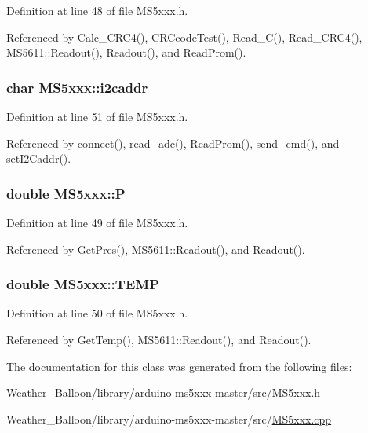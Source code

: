 Definition at line 48 of file M\+S5xxx.\+h.



Referenced by Calc\+\_\+\+C\+R\+C4(), C\+R\+Ccode\+Test(), Read\+\_\+\+C(), Read\+\_\+\+C\+R\+C4(), M\+S5611\+::\+Readout(), Readout(), and Read\+Prom().

\subsubsection[{\texorpdfstring{i2caddr}{i2caddr}}]{\setlength{\rightskip}{0pt plus 5cm}char M\+S5xxx\+::i2caddr\hspace{0.3cm}{\ttfamily [protected]}}\hypertarget{class_m_s5xxx_a66741674bcf2bda11f5645b63797a279}{}\label{class_m_s5xxx_a66741674bcf2bda11f5645b63797a279}


Definition at line 51 of file M\+S5xxx.\+h.



Referenced by connect(), read\+\_\+adc(), Read\+Prom(), send\+\_\+cmd(), and set\+I2\+Caddr().

\subsubsection[{\texorpdfstring{P}{P}}]{\setlength{\rightskip}{0pt plus 5cm}double M\+S5xxx\+::P\hspace{0.3cm}{\ttfamily [protected]}}\hypertarget{class_m_s5xxx_a5bf2b4f5b63d8acd877cc61346587e6a}{}\label{class_m_s5xxx_a5bf2b4f5b63d8acd877cc61346587e6a}


Definition at line 49 of file M\+S5xxx.\+h.



Referenced by Get\+Pres(), M\+S5611\+::\+Readout(), and Readout().

\subsubsection[{\texorpdfstring{T\+E\+MP}{TEMP}}]{\setlength{\rightskip}{0pt plus 5cm}double M\+S5xxx\+::\+T\+E\+MP\hspace{0.3cm}{\ttfamily [protected]}}\hypertarget{class_m_s5xxx_a8b9ea0d97301232352a0484e6e944753}{}\label{class_m_s5xxx_a8b9ea0d97301232352a0484e6e944753}


Definition at line 50 of file M\+S5xxx.\+h.



Referenced by Get\+Temp(), M\+S5611\+::\+Readout(), and Readout().



The documentation for this class was generated from the following files\+:\begin{DoxyCompactItemize}
\item 
Weather\+\_\+\+Balloon/library/arduino-\/ms5xxx-\/master/src/\hyperlink{_m_s5xxx_8h}{M\+S5xxx.\+h}\item 
Weather\+\_\+\+Balloon/library/arduino-\/ms5xxx-\/master/src/\hyperlink{_m_s5xxx_8cpp}{M\+S5xxx.\+cpp}\end{DoxyCompactItemize}
